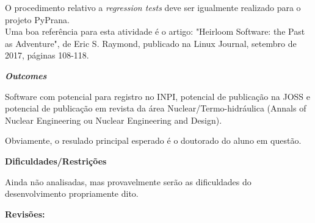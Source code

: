 O procedimento relativo a \textit{regression tests} deve ser igualmente realizado para 
o projeto PyPrana.\\

Uma boa referência para esta atividade é o artigo: "Heirloom Software: the Past as Adventure", de Eric S. Raymond, 
publicado na Linux Journal, setembro de 2017, páginas 108-118.

\textbf{\textit{Outcomes}}

Software com potencial para registro no INPI, potencial de publicação na JOSS e 
potencial de publicação em revista da área Nuclear/Termo-hidráulica (Annals of 
Nuclear Engineering ou Nuclear Engineering and Design).

Obviamente, o resulado principal esperado é o doutorado do aluno em questão.

\textbf{Dificuldades/Restrições}

Ainda não analisadas, mas provavelmente serão as dificuldades do desenvolvimento 
propriamente dito.

\textbf{Revisões:}

\date{\today}
